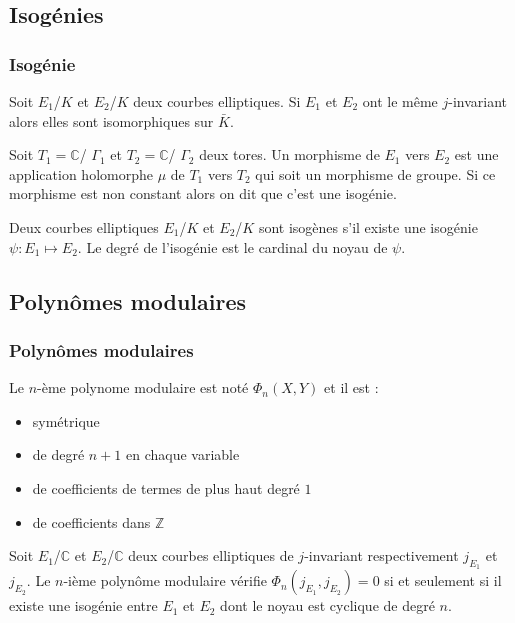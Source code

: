 \documentclass[french]{beamer}
\begin{document}
\subsection{Isogénies}
\begin{frame}
\frametitle{Isogénie}
\begin{definition}
Soit $E_1$/$K$ et $E_2$/$K$ deux courbes elliptiques. Si $E_1$ et $E_2$ ont le même $j$-invariant alors elles sont isomorphiques sur $\bar{K}$. 
\end{definition}

\begin{theorem}
Soit $T_1=\mathbb{C}$/ $\Gamma_1$ et $T_2 = \mathbb{C}$/ $\Gamma_2$ deux tores. Un morphisme de $E_1$ vers $E_2$ est une application holomorphe $\mu$ de $T_1$ vers $T_2$ qui soit un morphisme de groupe. Si ce morphisme est non constant alors on dit que c'est une isogénie.
\end{theorem}

Deux courbes elliptiques $E_1$/$K$ et $E_2$/$K$ sont isogènes s'il existe une isogénie $\psi : E_1 \mapsto E_2$. Le degré de l’isogénie est le cardinal du noyau de $\psi$.


\end{frame}
\subsection{Polynômes modulaires}
\begin{frame}
\frametitle{Polynômes modulaires}
Le $n$-ème polynome modulaire est noté $\Phi_n(X,Y)$ et il est :
\begin{itemize}
\item symétrique 
\item de degré $n+1$ en chaque variable
\item de coefficients de termes de plus haut degré $1$
\item de coefficients dans $\mathbb{Z}$
\end{itemize}
\begin{definition}
Soit $E_1$/$\mathbb{C}$ et $E_2$/$\mathbb{C}$ deux courbes elliptiques de $j$-invariant respectivement $j_{E_1}$ et $j_{E_2}$. Le $n$-ième polynôme modulaire vérifie $\Phi_n(j_{E_1},j_{E_2}) = 0$ si et seulement si il existe une isogénie entre $E_1$ et $E_2$ dont le noyau est cyclique de degré $n$.
\end{definition}


\end{frame}
\end{document}
